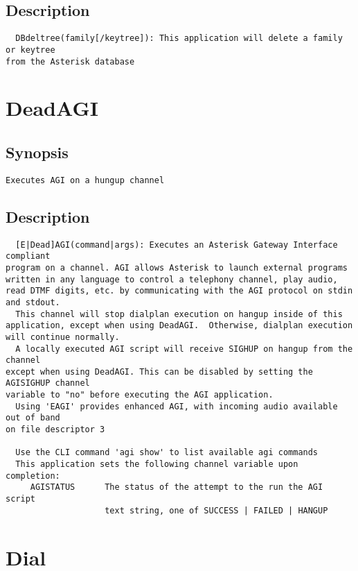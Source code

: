 \subsection{Description}
\begin{verbatim}
  DBdeltree(family[/keytree]): This application will delete a family or keytree
from the Asterisk database

\end{verbatim}


\section{DeadAGI}
\subsection{Synopsis}
\begin{verbatim}
Executes AGI on a hungup channel
\end{verbatim}
\subsection{Description}
\begin{verbatim}
  [E|Dead]AGI(command|args): Executes an Asterisk Gateway Interface compliant
program on a channel. AGI allows Asterisk to launch external programs
written in any language to control a telephony channel, play audio,
read DTMF digits, etc. by communicating with the AGI protocol on stdin
and stdout.
  This channel will stop dialplan execution on hangup inside of this
application, except when using DeadAGI.  Otherwise, dialplan execution
will continue normally.
  A locally executed AGI script will receive SIGHUP on hangup from the channel
except when using DeadAGI. This can be disabled by setting the AGISIGHUP channel
variable to "no" before executing the AGI application.
  Using 'EAGI' provides enhanced AGI, with incoming audio available out of band
on file descriptor 3

  Use the CLI command 'agi show' to list available agi commands
  This application sets the following channel variable upon completion:
     AGISTATUS      The status of the attempt to the run the AGI script
                    text string, one of SUCCESS | FAILED | HANGUP

\end{verbatim}


\section{Dial}
